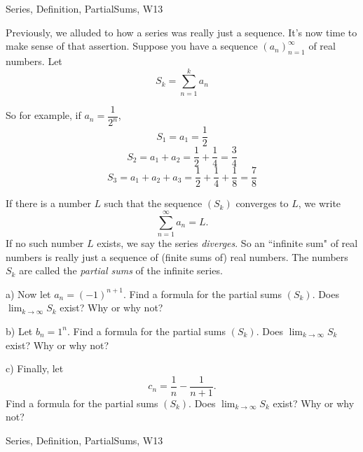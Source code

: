  \begin{tagblock}{Series, Definition, PartialSums, W13}
\begin{question}

Previously, we alluded to how a series was really just a sequence. It's now time to make sense of that assertion. Suppose you have a sequence $\displaystyle(a_n)_{n=1}^{\infty}$ of real numbers. Let
\begin{equation}\label{partial}
S_k=\sum_{n=1}^ka_n
\end{equation}

So for example, if $a_n=\dfrac 1 {2^n}$, 
\[
S_1=a_1=\frac 1 2
\]
\smallskip
\[
S_2=a_1+a_2=\frac 1 2 +\frac 1 4=\frac 3 4
\]
\smallskip
\[
S_3=a_1+a_2+a_3=\frac 1 2 +\frac 1 4 +\frac 1 8=\frac 7 8
\]


\bigskip

If there is a number $L$ such that the sequence $(S_k)$ converges to $L$, we write
\[
\sum_{n=1}^{\infty}a_n=L.
\]
If no such number $L$ exists, we say the series \textit{diverges}. So an ``infinite sum" of real numbers is really just a sequence of (finite sums of) real numbers. The numbers $S_k$ are called the \textit{partial sums} of the infinite series.  

\bigskip

a) Now let $a_n=(-1)^{n+1}$. Find a formula for the partial sums $(S_k)$. Does $\displaystyle\lim_{k\to\infty}S_k$ exist? Why or why not?

\bigskip

b) Let $b_n=1^n$. Find a formula for the partial sums $(S_k)$. Does $\displaystyle\lim_{k\to\infty}S_k$ exist? Why or why not?


\bigskip

c) Finally, let 
\[
c_n=\dfrac 1 n-\frac 1 {n+1}.
\] 
Find a formula for the partial sums $(S_k)$. Does $\displaystyle\lim_{k\to\infty}S_k$ exist? Why or why not?
	
	
\begin{tags}
	    Series, Definition, PartialSums, W13
\end{tags}
	
\begin{diary}
	    
\end{diary}
	
\begin{solution}
	   
\end{solution}
	
\end{question}

\end{tagblock}

